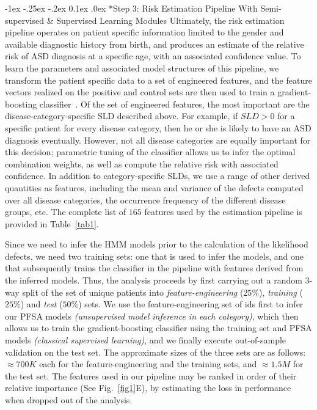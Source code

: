\documentclass[onecolumn,,10pt]{IEEEtran}
\makeatletter
\renewcommand\subsection{\@startsection {section}{1}{\z@}%
  {-1ex \@plus -.25ex \@minus -.2ex}%
  {0.1ex \@plus.0ex}%
  {\fontsize{11}{12}\selectfont\bfseries\sffamily\color{DodgerBlue4}}}
\def\treatment{positive\xspace}
\makeatother
\begin{document}
\subsection*{Step 3: Risk Estimation Pipeline With Semi-supervised \& Supervised Learning Modules}
Ultimately, the risk estimation pipeline operates on patient specific information limited to the
gender and available  diagnostic history from birth, and produces an estimate of the relative risk of ASD diagnosis at a specific age, with an associated  confidence value.
To learn the parameters and associated model structures of  this pipeline, we transform the patient specific data to a set of engineered features, and the feature vectors realized on the
\treatment and control sets are then used to train a gradient-boosting classifier~\cite{gbm02}. Of the set of engineered features, the most important are the  disease-category-specific SLD described above. For example, if $SLD > 0$ for a specific patient for every disease category, then he or she is likely to have an ASD diagnosis eventually. However, not all disease categories are equally important for this decision; parametric  tuning of the classifier allows us to infer the optimal combination weights, as well as compute the relative risk  with associated confidence. In addition to category-specific SLDs, we use a range of other derived quantities as features, including the mean and variance of the defects computed over all disease categories, the occurrence frequency of the different disease groups, etc. The complete list of $165$ features used by the  estimation pipeline  is provided in Table~\ref{tab1}.

Since we need to infer the HMM models prior to the calculation of the likelihood defects, we need two training sets: one that is used to infer the models, and one that subsequently trains the classifier in the  pipeline with features  derived  from the inferred models. Thus, the analysis proceeds by first carrying out a random 3-way split of the set of unique patients into \textit{feature-engineering} ($25\%$), \textit{training} ($25\%$) and \textit{test} ($50\%$) sets. We use the feature-engineering set of ids first to infer our PFSA models \textit{(unsupervised model inference in each category)}, which then allows us to train the gradient-boosting classifier using the training set and PFSA models \textit{(classical supervised learning)}, and we finally execute  out-of-sample validation on the test set. The approximate sizes of the three sets are as follows: $\approx 700K$ each for the feature-engineering and the training sets, and $\approx 1.5M$ for the test set. The features used in our pipeline may be ranked in order of their relative importance (See Fig.~\ref{fig1}E), by
estimating the loss in performance when dropped out of the analysis.
\end{document}
